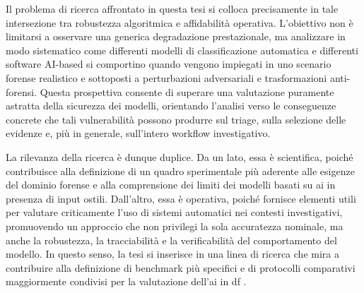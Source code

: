 Il problema di ricerca affrontato in questa tesi si colloca precisamente in tale intersezione tra robustezza algoritmica e affidabilità operativa. L'obiettivo non è limitarsi a osservare una generica degradazione prestazionale, ma analizzare in modo sistematico come differenti modelli di classificazione automatica e differenti software AI-based si comportino quando vengono impiegati in uno scenario forense realistico e sottoposti a perturbazioni adversariali e trasformazioni anti-forensi. Questa prospettiva consente di superare una valutazione puramente astratta della sicurezza dei modelli, orientando l'analisi verso le conseguenze concrete che tali vulnerabilità possono produrre sul triage, sulla selezione delle evidenze e, più in generale, sull'intero workflow investigativo.

La rilevanza della ricerca è dunque duplice. Da un lato, essa è scientifica, poiché contribuisce alla definizione di un quadro sperimentale più aderente alle esigenze del dominio forense e alla comprensione dei limiti dei modelli basati su \gls{ai} in presenza di input ostili. Dall'altro, essa è operativa, poiché fornisce elementi utili per valutare criticamente l'uso di sistemi automatici nei contesti investigativi, promuovendo un approccio che non privilegi la sola accuratezza nominale, ma anche la robustezza, la tracciabilità e la verificabilità del comportamento del modello. In questo senso, la tesi si inserisce in una linea di ricerca che mira a contribuire alla definizione di benchmark più specifici e di protocolli comparativi maggiormente condivisi per la valutazione dell'\gls{ai} in \gls{df} \cite{silva2021microservices,mckeown2024phaser,sanna2024preliminary,sanna2025pixelperfect}.


